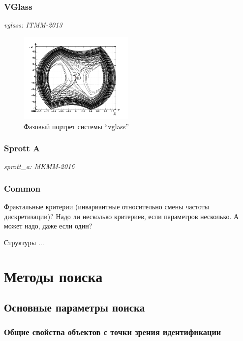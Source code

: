 \documentclass[a4paper,12pt]{article}
\newcommand{\LinkRef}[1]{ \textit{#1} }
\begin{document}
\FloatBarrier
\subsubsection{VGlass} %

\LinkRef{
  vglass: ITMM-2013
}

\begin{figure}[htb!]
\centerline{\includegraphics[width=0.5\textwidth]{p/cha/vg1-graph_phase.png} }
\caption{Фазовый портрет системы ``vglass'' }
\label{atu:f:vglass_phase}
\end{figure}

\FloatBarrier
\subsubsection{Sprott A}

\LinkRef{
  sprott\_a: MKMM-2016
}


\FloatBarrier
\subsubsection{Common}

Фрактальные критерии (инвариантные относительно смены частоты дискретизации)?
Надо ли несколько критериев, если параметров несколько.
А может надо, даже если один?

Структуры ...



\FloatBarrier
\section{Методы поиска}

\subsection{Основные параметры поиска}


\subsubsection{Общие свойства объектов с точки зрения идентификации}
\end{document}
